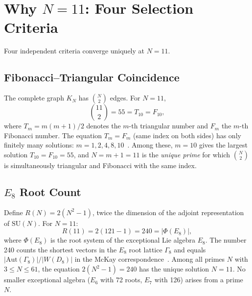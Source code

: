 \documentclass[aip,jmp,reprint,superscriptaddress,floatfix,nofootinbib]{revtex4-2}
\theoremstyle{definition}
\theoremstyle{remark}
\begin{document}
\section{Why \texorpdfstring{$N = 11$}{N = 11}: Four Selection Criteria}
\label{sec:n11}

Four independent criteria converge uniquely at $N = 11$.

\subsection{Fibonacci--Triangular Coincidence}
\label{sec:n11:fib}

The complete graph $K_N$ has $\binom{N}{2}$ edges.  For $N = 11$,
\begin{equation}\label{eq:fib-tri}
\binom{11}{2} = 55 = T_{10} = F_{10},
\end{equation}
where $T_m = m(m{+}1)/2$ denotes the $m$-th triangular number and
$F_m$ the $m$-th Fibonacci number.  The equation $T_m = F_m$ (same
index on both sides) has only finitely many solutions: $m = 1, 2, 4,
8, 10$~\cite{Luo1989}.  Among these, $m = 10$ gives the largest
solution $T_{10} = F_{10} = 55$, and $N = m + 1 = 11$ is the
\emph{unique prime} for which $\binom{N}{2}$ is simultaneously
triangular and Fibonacci with the same index.

\subsection{\texorpdfstring{$E_8$}{E8} Root Count}
\label{sec:n11:e8}

Define $R(N) = 2(N^2 - 1)$, twice the dimension of the adjoint
representation of $\mathrm{SU}(N)$.  For $N = 11$:
\begin{equation}\label{eq:e8-root}
R(11) = 2(121 - 1) = 240 = |\Phi(E_8)|,
\end{equation}
where $\Phi(E_8)$ is the root system of the exceptional Lie algebra
$E_8$.  The number 240 counts the shortest vectors in the $E_8$ root
lattice $\Gamma_8$ and equals $|\mathrm{Aut}(\Gamma_8)|/|W(D_8)|$ in
the McKay correspondence~\cite{McKay1980}.  Among all primes $N$ with
$3 \le N \le 61$, the equation $2(N^2 - 1) = 240$ has the unique
solution $N = 11$.  No smaller exceptional algebra ($E_6$ with 72
roots, $E_7$ with 126) arises from a prime~$N$.
\end{document}
